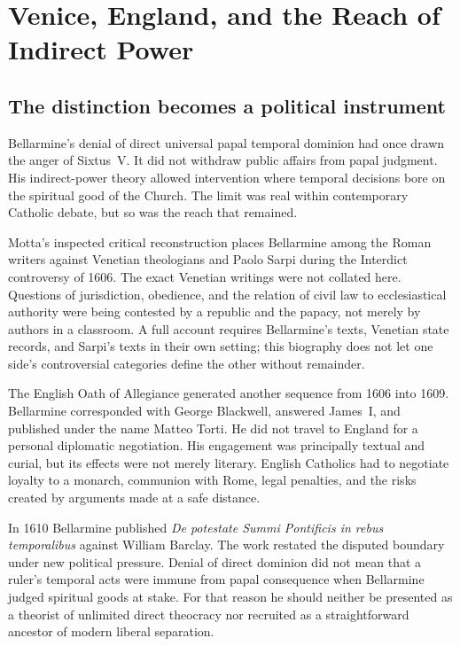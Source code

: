 \section{Venice, England, and the Reach of Indirect Power}

\subsection{The distinction becomes a political instrument}

Bellarmine's denial of direct universal papal temporal dominion had once drawn
the anger of Sixtus~V.  It did not withdraw public affairs from papal judgment.
His indirect-power theory allowed intervention where temporal decisions bore
on the spiritual good of the Church.  The limit was real within contemporary
Catholic debate, but so was the reach that remained.

Motta's inspected critical reconstruction places Bellarmine among the Roman
writers against Venetian theologians and Paolo Sarpi during the Interdict
controversy of 1606.  The exact Venetian writings were not collated here.
Questions of jurisdiction, obedience, and the relation of civil law to
ecclesiastical authority were being contested by a republic and the papacy,
not merely by authors in a classroom.  A full account requires Bellarmine's
texts, Venetian state records, and Sarpi's texts in their own setting; this
biography does not let one side's controversial categories define the other
without remainder.

The English Oath of Allegiance generated another sequence from 1606 into 1609.
Bellarmine corresponded with George Blackwell, answered James~I, and published
under the name Matteo Torti.  He did not travel to England for a personal
diplomatic negotiation.  His engagement was principally textual and curial,
but its effects were not merely literary.  English Catholics had to negotiate
loyalty to a monarch, communion with Rome, legal penalties, and the risks
created by arguments made at a safe distance.

In 1610 Bellarmine published \emph{De potestate Summi Pontificis in rebus
temporalibus} against William Barclay.  The work restated the disputed boundary
under new political pressure.  Denial of direct dominion did not mean that a
ruler's temporal acts were immune from papal consequence when Bellarmine judged
spiritual goods at stake.  For that reason he should neither be presented as a
theorist of unlimited direct theocracy nor recruited as a straightforward
ancestor of modern liberal separation.

